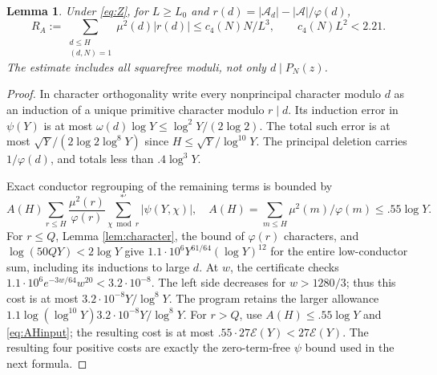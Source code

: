 \documentclass[11pt]{article}
\newtheorem{lemma}[theorem]{Lemma}
\theoremstyle{remark}\newtheorem{remark}[theorem]{Remark}
\newcommand{\A}{\mathcal A}
\begin{document}
\begin{lemma}\label{lem:AP}
Under \eqref{eq:Z}, for $L\ge L_0$ and
$r(d)=|\A_d|-|\A|/\varphi(d)$,
\[
R_A:=\sum_{\substack{d\le H\\(d,N)=1}}\mu^2(d)|r(d)|
\le c_4(N)N/L^3,\qquad c_4(N)L^2<2.21.
\]
The estimate includes all squarefree moduli, not only $d\mid P_N(z)$.
\end{lemma}
\begin{proof}
In character orthogonality write every nonprincipal character modulo
$d$ as an induction of a unique primitive character modulo $r\mid d$.
Its induction error in $\psi(Y)$ is at most
$\omega(d)\log Y\le\log^2Y/(2\log2)$.
The total such error is at most $\sqrt Y/(2\log2\log^8Y)$ since
$H\le\sqrt Y/\log^{10}Y$.
The principal deletion carries $1/\varphi(d)$, and totals less than
$.4\log^3Y$.

Exact conductor regrouping of the remaining terms is bounded by
\[
A(H)\sum_{r\le H}\frac{\mu^2(r)}{\varphi(r)}
\sum_{\chi\bmod r}^{*\prime}|\psi(Y,\chi)|,
\quad A(H)=\sum_{m\le H}\mu^2(m)/\varphi(m)\le.55\log Y.
\]
For $r\le Q$, Lemma \ref{lem:character}, the bound of $\varphi(r)$
characters, and $\log(50QY)<2\log Y$ give
$1.1\cdot10^6Y^{61/64}(\log Y)^{12}$ for the entire low-conductor sum,
including its inductions to large $d$.
At $w$, the certificate checks
$1.1\cdot10^6e^{-3w/64}w^{20}<3.2\cdot10^{-8}$.
The left side decreases for $w>1280/3$; thus this cost is at most
$3.2\cdot10^{-8}Y/\log^8Y$.
The program retains the larger allowance
$1.1\log(\log^{10}Y)3.2\cdot10^{-8}Y/\log^8Y$.
For $r>Q$, use $A(H)\le.55\log Y$ and \eqref{eq:AHinput};
the resulting cost is at most $.55\cdot27\mathcal E(Y)<27\mathcal E(Y)$.
The resulting four positive costs are exactly the zero-term-free
$\psi$ bound used in the next formula.


\end{proof}
\end{document}
